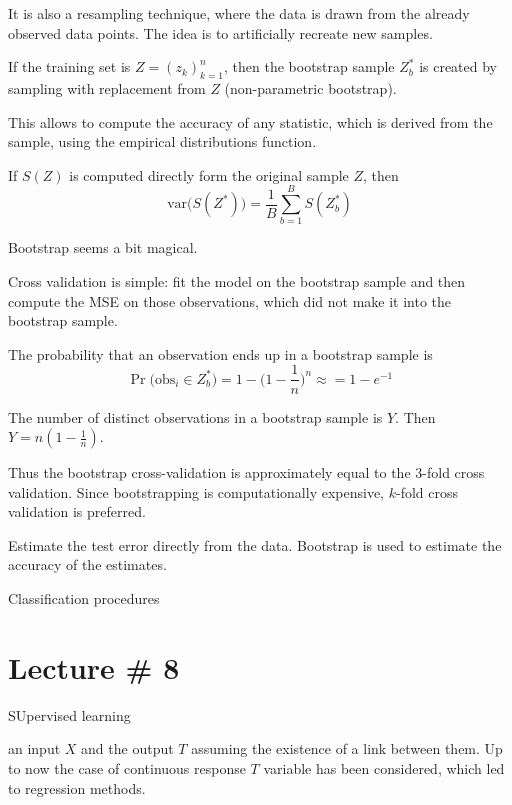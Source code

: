 \documentclass[a4paper]{article}
\newcommand{\brac}[1]{{\left ( #1 \right )}}
\newcommand{\var}[0]{{\text{var}}}
\begin{document}
It is also a resampling technique, where the data is drawn from the already observed data points. The idea is to artificially recreate new samples.

If the training set is $Z=\brac{z_k}_{k=1}^n$, then the bootstrap sample $Z^*_b$ is created by sampling with replacement from $Z$ (non-parametric bootstrap).

This allows to compute the accuracy of any statistic, which is derived from the sample, using the empirical distributions function.

If $S(Z)$ is computed directly form the original sample $Z$, then 
\[\var\big(S(Z^*)\big) = \frac{1}{B}\sum_{b=1}^B S(Z^*_b)\]

Bootstrap seems a bit magical.

Cross validation is simple: fit the model on the bootstrap sample and then compute the MSE on those observations, which did not make it into the bootstrap sample.

The probability that an observation ends up in a bootstrap sample is 
\[\Pr\big(\text{obs}_i\in Z^*_b\big) = 1 - \big(1-\frac{1}{n}\big)^n\approx = 1-e^{-1}\]

The number of distinct observations in a bootstrap sample is $Y$. Then $Y = n (1-\frac{1}{n})$.

Thus the bootstrap cross-validation is approximately equal to the $3$-fold cross validation.
Since bootstrapping is computationally expensive, $k$-fold cross validation is preferred.




Estimate the test error directly from the data.
Bootstrap is used to estimate the accuracy of the estimates.




Classification procedures


\section{Lecture \# 8} %
\label{sec:lecture_8}

SUpervised learning

an input $X$ and the output $T$ assuming the existence of a link between them. Up to now the case of continuous response $T$ variable has been considered, which led to regression methods.
\end{document}
